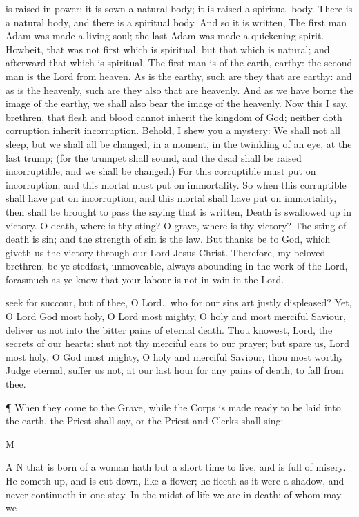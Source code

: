 is raised in power: it is sown a natural body; it is raised a spiritual body. There is a natural body, and there is a spiritual body. And so it is written, The first man Adam was made a living soul; the last Adam was made a quickening spirit. Howbeit, that was not first which is spiritual, but that which is natural; and afterward that which is spiritual. The first man is of the earth, earthy: the second man is the Lord from heaven. As is the earthy, such are they that are earthy: and as is the heavenly, such are they also that are heavenly. And as we have borne the image of the earthy, we shall also bear the image of the heavenly. Now this I say, brethren, that flesh and blood cannot inherit the kingdom of God; neither doth corruption inherit incorruption. Behold, I shew you a mystery: We shall not all sleep, but we shall all be changed, in a moment, in the twinkling of an eye, at the last trump; (for the trumpet shall sound, and the dead shall be raised incorruptible, and we shall be changed.) For this corruptible must put on incorruption, and this mortal must put on immortality. So when this corruptible shall have put on incorruption, and this mortal shall have put on immortality, then shall be brought to pass the saying that is written, Death is swallowed up in victory. O death, where is thy sting? O grave, where is thy victory? The sting of death is sin; and the strength of sin is the law. But thanks be to God, which giveth us the victory through our Lord Jesus Christ. Therefore, my beloved brethren, be ye stedfast, unmoveable, always abounding in the work of the Lord, forasmuch as ye know that your labour is not in vain in the Lord.

seek for succour, but of thee, O Lord., who for our sins art justly displeased? Yet, O Lord God most holy, O Lord most mighty, O holy and most merciful Saviour, deliver us not into the bitter pains of eternal death. Thou knowest, Lord, the secrets of our hearts: shut not thy merciful ears to our prayer; but spare us, Lord most holy, O God most mighty, O holy and merciful Saviour, thou most worthy Judge eternal, suffer us not, at our last hour for any pains of death, to fall from thee.

¶ When they come to the Grave, while the Corps is made ready to be laid into the earth, the Priest shall say, or the Priest and Clerks shall sing:

M

A N that is born of a woman hath but a short time to live, and is full of misery. He cometh up, and is cut down, like a flower; he fleeth as it were a shadow, and never continueth in one stay. In the midst of life we are in death: of whom may we

